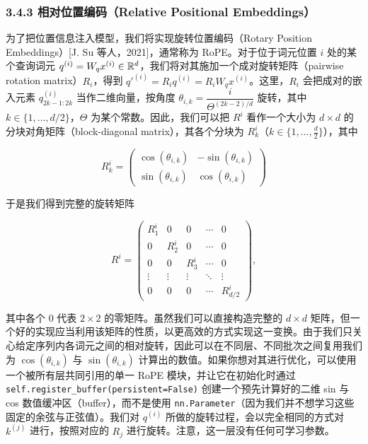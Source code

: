 \subsubsection*{3.4.3 相对位置编码（Relative Positional Embeddings）}

为了把位置信息注入模型，我们将实现旋转位置编码（Rotary Position Embeddings）[J. Su 等人，2021]，通常称为 RoPE。对于位于词元位置 $i$ 处的某个查询词元 $q^{(i)} = W_q x^{(i)} \in \mathbb{R}^{d}$，我们将对其施加一个成对旋转矩阵（pairwise rotation matrix）$R_i$，得到 $q'^{(i)} = R_i q^{(i)} = R_i W_q x^{(i)}$。这里，$R_i$ 会把成对的嵌入元素 $q^{(i)}_{2k-1:2k}$ 当作二维向量，按角度 $\theta_{i,k} = \dfrac{i}{\Theta^{(2k-2)/d}}$ 旋转，其中 $k \in \{1, \dots, d/2\}$，$\Theta$ 为某个常数。因此，我们可以把 $R^i$ 看作一个大小为 $d \times d$ 的分块对角矩阵（block-diagonal matrix），其各个分块为 $R^i_k$（$k \in \{1, \dots, \tfrac{d}{2}\}$），其中

\begin{equation*}
R^i_k =
\begin{pmatrix}
\cos(\theta_{i,k}) & -\sin(\theta_{i,k}) \\
\sin(\theta_{i,k}) & \cos(\theta_{i,k})
\end{pmatrix}
\tag{8}
\end{equation*}

于是我们得到完整的旋转矩阵

\begin{equation*}
R^i =
\begin{pmatrix}
R^i_1 & 0 & 0 & \cdots & 0 \\
0 & R^i_2 & 0 & \cdots & 0 \\
0 & 0 & R^i_3 & \cdots & 0 \\
\vdots & \vdots & \vdots & \ddots & \vdots \\
0 & 0 & 0 & \cdots & R^i_{d/2}
\end{pmatrix},
\tag{9}
\end{equation*}

其中各个 $0$ 代表 $2 \times 2$ 的零矩阵。虽然我们可以直接构造完整的 $d \times d$ 矩阵，但一个好的实现应当利用该矩阵的性质，以更高效的方式实现这一变换。由于我们只关心给定序列内各词元之间的相对旋转，因此可以在不同层、不同批次之间复用我们为 $\cos(\theta_{i,k})$ 与 $\sin(\theta_{i,k})$ 计算出的数值。如果你想对其进行优化，可以使用一个被所有层共同引用的单一 RoPE 模块，并让它在初始化时通过 \texttt{self.register\_buffer(persistent=False)} 创建一个预先计算好的二维 sin 与 cos 数值缓冲区（buffer），而不是使用 \texttt{nn.Parameter}（因为我们并不想学习这些固定的余弦与正弦值）。我们对 $q^{(i)}$ 所做的旋转过程，会以完全相同的方式对 $k^{(j)}$ 进行，按照对应的 $R_j$ 进行旋转。注意，这一层没有任何可学习参数。

